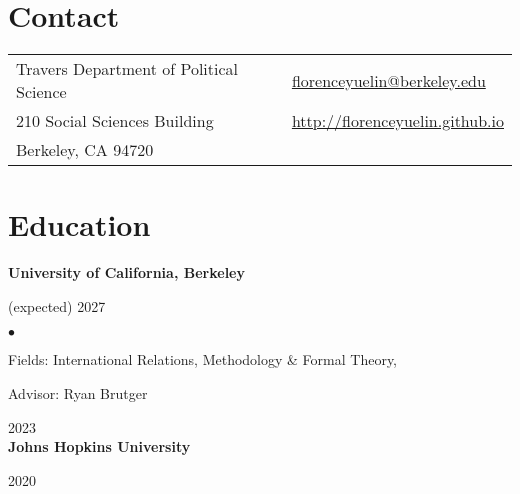 \documentclass[margin,line]{res}
\newenvironment{list2}{
  \begin{list}{$\bullet$}{%
      \setlength{\itemsep}{0in}
      \setlength{\parsep}{0in} \setlength{\parskip}{0in}
      \setlength{\topsep}{0in} \setlength{\partopsep}{0in} 
      \setlength{\leftmargin}{0.43in}}}{\end{list}}
\begin{document}

\begin{resume}
	
\section{\sc Contact}
\begin{tabular}{@{}p{3.8in}p{3in}@{}}
	Travers Department of Political Science & \textcolor{darkblue}{\href{mailto:florenceyuelin@berkeley.edu}{florenceyuelin@berkeley.edu}}\\
	210 Social Sciences Building &
	 \textcolor{darkblue}{\href{florenceyuelin.github.io}{http://florenceyuelin.github.io}}\\ 
	Berkeley, CA 94720               
\end{tabular}

\section{\sc Education}

{\bf University of California, Berkeley}
\vspace{-.33cm}

\hspace{1.5em}{Ph.D., Political Science} \hfill{(expected) 2027} \\
\vspace*{-.13in}  
\begin{list2}
	\item Fields: International Relations, Methodology \& Formal Theory, \\
	\hspace*{3.3em}{Political Economy (Designated Emphasis)}
	\item Advisor: Ryan Brutger
\end{list2}

\vspace{-.33cm}
\hspace{1.5em}{M.A., Political Science} \hfill{2023} \\

\vspace{-.33cm}
{\bf Johns Hopkins University}

\vspace{-.33cm}

\hspace{1.5em}{M.A., International Economics and International Relations} \hfill{2020} \\
\vspace*{-.13in}  


\end{resume}
\end{document}
